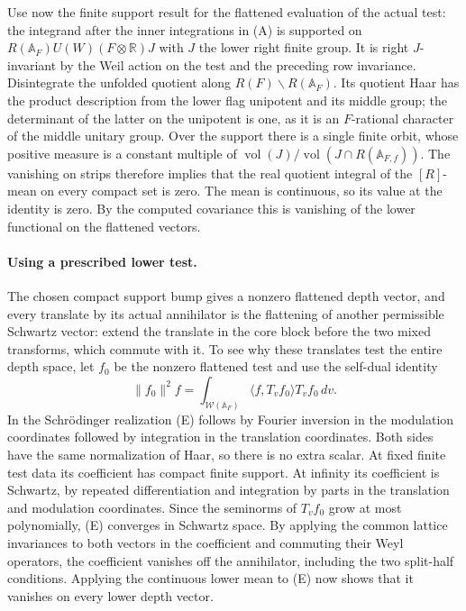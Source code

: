 Use now the finite support result for the flattened evaluation
of the actual test: the integrand after the inner integrations
in (A) is supported on
\(R(\mathbb A_F)U(W)(F\otimes\mathbb R)J\) with \(J\)
the lower right finite group. It is right \(J\)-invariant by
the Weil action on the test and the preceding row invariance.
Disintegrate the unfolded quotient along
\(R(F)\backslash R(\mathbb A_F)\). Its quotient Haar
has the product description from the lower flag unipotent and
its middle group; the determinant of the latter on the
unipotent is one, as it is an \(F\)-rational character of
the middle unitary group. Over the support there is a single
finite orbit, whose positive measure is a constant multiple
of \(\operatorname{vol}(J)/\operatorname{vol}(J\cap
R(\mathbb A_{F,f}))\). The vanishing on strips therefore
implies that the real quotient integral of the \([R]\)-mean
on every compact set is zero. The mean is continuous, so its
value at the identity is zero. By the computed covariance this
is vanishing of the lower functional on the flattened vectors.

\paragraph{Using a prescribed lower test.}
The chosen compact support bump gives a nonzero flattened
depth vector, and every translate by its actual annihilator
is the flattening of another permissible Schwartz vector:
extend the translate in the core block before the two mixed
transforms, which commute with it. To see why these translates
test the entire depth space, let \(f_0\) be the nonzero
flattened test and use the self-dual identity
\[
 \|f_0\|^2 f
   =\int_{\mathscr W(\mathbb A_F)}
         \langle f,T_v f_0\rangle T_v f_0\,dv .
 \tag{E}
\]
In the Schr\"odinger realization (E) follows by Fourier
inversion in the modulation coordinates followed by
integration in the translation coordinates. Both sides have
the same normalization of Haar, so there is no extra scalar.
At fixed finite test data its coefficient has compact finite
support. At infinity its coefficient is Schwartz, by repeated
differentiation and integration by parts in the translation
and modulation coordinates. Since the seminorms of \(T_v f_0\)
grow at most polynomially, (E) converges in Schwartz space.
By applying the common lattice invariances to both vectors
in the coefficient and commuting their Weyl operators, the
coefficient vanishes off the annihilator, including the two
split-half conditions. Applying the continuous lower mean to
(E) now shows that it vanishes on every lower depth vector.

